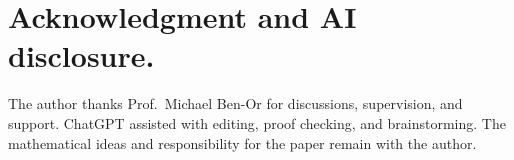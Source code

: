 \documentclass[manuscript,screen,review]{acmart}
\begin{document}

\tableofcontents
\newpage





\section{Acknowledgment and AI disclosure.}
The author thanks Prof.~Michael Ben-Or for discussions, supervision, and support. ChatGPT assisted with editing, proof checking, and brainstorming. The mathematical ideas and responsibility for the paper remain with the author.

\printbibliography
% 
\end{document}
